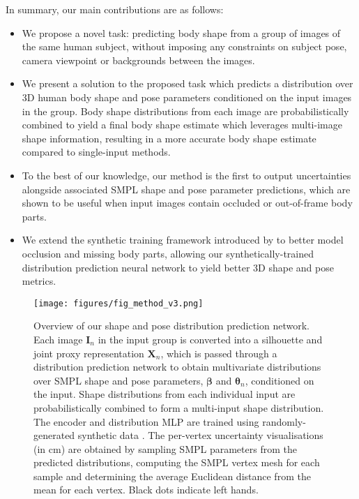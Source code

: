 \documentclass[final]{cvpr}
\begin{document}
In summary, our main contributions are as follows:
\begin{itemize}
    \item We propose a novel task: predicting body shape from a group of images of the same human subject, without imposing any constraints on subject pose, camera viewpoint or backgrounds between the images.
    \item We present a solution to the proposed task which predicts a distribution over 3D human body shape and pose parameters conditioned on the input images in the group. Body shape distributions from each image are probabilistically combined to yield a final body shape estimate which leverages multi-image shape information, resulting in a more accurate body shape estimate compared to single-input methods.
    \item To the best of our knowledge, our method is the first to output uncertainties alongside associated SMPL \cite{SMPL:2015} shape and pose parameter predictions, which are shown to be useful when input images contain occluded or out-of-frame body parts.
    \item We extend the synthetic training framework introduced by \cite{STRAPS2020BMVC} to better model occlusion and missing body parts, allowing our synthetically-trained distribution prediction neural network to yield better 3D shape and pose metrics.
\end{itemize}

\begin{figure*}[t]
    \centering
    \texttt{[image: figures/fig\_method\_v3.png]}
    \caption{Overview of our shape and pose distribution prediction network. Each image $\mathbf{I}_n$ in the input group is converted into a silhouette and joint proxy representation $\mathbf{X}_n$, which is passed through a distribution prediction network to obtain multivariate distributions over SMPL \cite{SMPL:2015} shape and pose parameters, $\boldsymbol{\beta}$ and $\boldsymbol{\theta}_n$, conditioned on the input. Shape distributions from each individual input are probabilistically combined to form a multi-input shape distribution. The encoder and distribution MLP are trained using randomly-generated synthetic data \cite{STRAPS2020BMVC}. The per-vertex uncertainty visualisations (in cm) are obtained by sampling SMPL parameters from the predicted distributions, computing the SMPL vertex mesh for each sample and determining the average Euclidean distance from the mean for each vertex. Black dots indicate left hands.}
    \label{fig:method}
    \vspace{-0.3cm}
\end{figure*}
\end{document}
